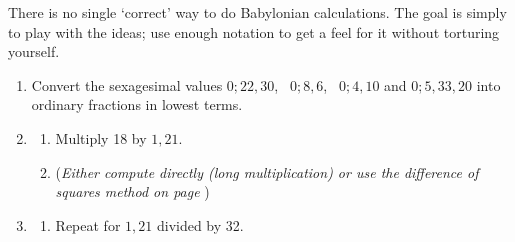 \begin{exercises*}{}{}
	There is no single `correct' way to do Babylonian calculations. The goal is simply to play with the ideas; use enough notation to get a feel for it without torturing yourself.
	
	\begin{enumerate}%
	  \item %
	  Convert the sexagesimal values $0;22,30$, \ $0;8,6$, \ $0;4,10$ and $0;5,33,20$ into ordinary fractions in lowest terms.
	  
	  
	  \item\begin{enumerate}%
	    \item {}\lstsp Multiply 18 by $1,21$.
	    \item[](\emph{Either compute directly (long multiplication) or use the difference of squares method on page \pageref{babmult}})
	  \end{enumerate}
	  
	  
	  \item\begin{enumerate}%
	    \item {}\lstsp Repeat for $1,21$ divided by 32.
	  \end{enumerate}
	  
	  
	

\end{enumerate}
\end{exercises*}

